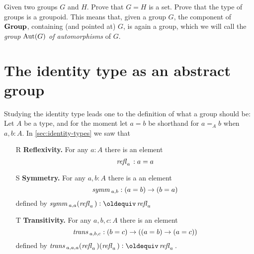   \begin{xca}\label{xca:typegroupisgroupoid}
    Given two groups $G$ and $H$.  Prove that $G=H$ is a set.   Prove that the type of groups is a groupoid.  This means that, given a group $G$, the component of $\mathbf{Group}$, containing (and pointed at) $G$, is again a group, which we will call the \emph{group $\mathrm{Aut}(G)$ of automorphisms} of $G$.
  \end{xca}

\section{The identity type as an abstract group }
\label{sec:identity-type-as-abstract}

Studying the identity type leads one to the definition of what a group should be:
Let $A$ be a type, and for the moment let $a=b$ be shorthand for $a=_Ab$ when $a,b:A$.  In \cref{sec:identity-types} we saw that
\begin{enumerate}
\item[R] {\bf Reflexivity.} For any $a:A$ there is an element
$$\mathop{{\it refl}_{a}}{}:a=a$$ 
\item[S] {\bf Symmetry.} For any $a,b:A$ there is a an element $$\mathop{\mathit{symm}}{}_{a,b}:(a=b)\to (b=a)$$ defined by $\symm{}_{a,a}(\refl a{})\defequi\refl a{}$
\item[T] {\bf Transitivity.} For any $a,b,c:A$ there is an element $$\mathop{\mathit{trans}}{}_{a,b,c}:(b=c)\to((a=b)\to(a=c))$$ defined by $\trans{}_{a,a,a}(\refl a{})(\refl a{})\defequi \refl a{}$.
\end{enumerate}

